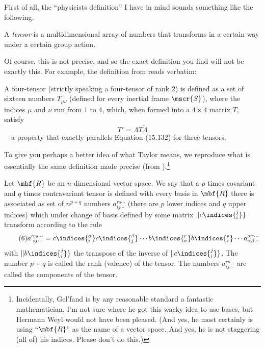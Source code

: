 First of all, the ``physicists definition'' I have in mind sounds something like the following.
\begin{important}
	A \emph{tensor} is a multidimensional array of numbers that transforms in a certain way under a certain group action.
\end{important}
Of course, this is not precise, and so the exact definition you find will not be exactly this.  For example, the definition from \cite[pg.~659]{Taylor} reads verbatim:
\begin{important}
	A four-tensor (strictly speaking a four-tensor of rank $2$) is defined as a set of sixteen numbers $T_{\mu \nu}$ (defined for every inertial frame $\mscr{S}$), where the indices $\mu$ and $\nu$ run from $1$ to $4$, which, when formed into a $4\times 4$ matrix $T$, satisfy
	\begin{equation*}
		T'=\Lambda T\tilde{\Lambda}\tag{15.137}
	\end{equation*}
	---a property that exactly parallels Equation (15.132) for three-tensors.
\end{important}
To give you perhaps a better idea of what Taylor means, we reproduce what is essentially the same definition made precise (from \cite[pg.~175]{Gelfand}).\footnote{Incidentally, Gel'fand is by any reasonable standard a fantastic mathematician.  I'm not sure where he got this wacky idea to use bases, but Hermann Weyl would not have been pleased.  (And yes, he most certainly is using ``$\mbf{R}$'' as the name of a vector space.  And yes, he is not staggering (all of) his indices.  Please don't do this.)}
\begin{important}
	Let $\mbf{R}$ be an $n$-dimensional vector space.  We say that a $p$ times covariant and $q$ times contravariant tensor is defined with every basis in $\mbf{R}$ there is associated as set of $n^{p+q}$ numbers $a_{ij\cdots}^{rs\cdots}$ (there are $p$ lower indices and $q$ upper indices) which under change of basis defined by some matrix $\| c\indices{_i^j}\}$ transform according to the rule
	\begin{equation*}
		\tag*{(6)}a'{}_{ij\cdots}^{rs\cdots}=c\indices{_i^{\alpha}}c\indices{_j^{\beta}}\cdots b\indices{_{\sigma}^r}b\indices{_{\tau}^s}\cdots a_{\alpha \beta \cdots}^{\sigma \tau \cdots}
	\end{equation*}
	with $\| b\indices{_i^j}\}$ the transpose of the inverse of $\| c\indices{_i^j}\}$.  The number $p+q$ is called the rank (valence) of the tensor.  The numbers $a_{ij\cdots}^{rs\cdots}$ are called the components of the tensor.
\end{important}


